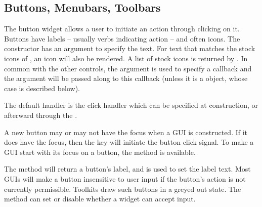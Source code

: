 \subsection{Buttons, Menubars, Toolbars}
\label{sec:gWidgets-buttons}

The button widget allows a user to initiate an action through clicking on
it. Buttons have labels -- usually verbs indicating action -- and often
icons. The  constructor has an argument
 to specify the text.  For text that matches
the stock icons of , an icon will also be rendered. A list of stock icons is returned by . In common with the other controls, the argument
 is used to specify a callback and the
 argument will be passed along to this
callback (unless it is a  object, whose case is described
below).

The default handler is the click handler which can be specified at
construction, or afterward through the
.


A new button may or may not have the focus when a GUI is
constructed. If it does have the focus, then the  key will
initiate the button click signal. To make a GUI start with its focus
on a button, the  method is available. 

The  method will return a button's label, and
 is used to set the label text.
Most GUIs will make a button insensitive to user input if the button's
action is not currently permissible. Toolkits draw such buttons in a
greyed out state. The  method can set or
disable whether a widget can accept input.





